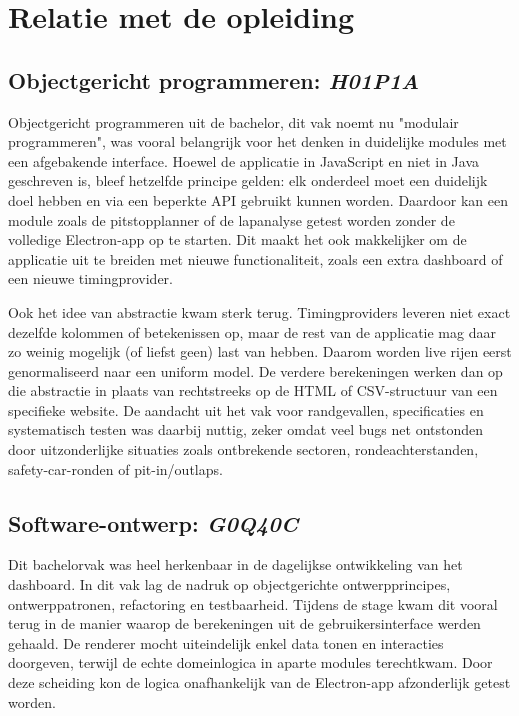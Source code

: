 
\chapter{Relatie met de opleiding}
\label{chap:opleiding}

\section{Objectgericht programmeren: \emph{H01P1A}}
Objectgericht programmeren uit de bachelor, dit vak noemt nu "modulair programmeren",
was vooral belangrijk voor het denken in duidelijke modules met een afgebakende interface. Hoewel de
applicatie in JavaScript en niet in Java geschreven is, bleef hetzelfde principe gelden: elk onderdeel
moet een duidelijk doel hebben en via een beperkte API gebruikt kunnen worden. Daardoor kan een module
zoals de pitstopplanner of de lapanalyse getest worden zonder de volledige Electron-app op te starten. Dit maakt het ook makkelijker om de applicatie uit te breiden met nieuwe functionaliteit, zoals een extra dashboard of een nieuwe timingprovider.

Ook het idee van abstractie kwam sterk terug. Timingproviders leveren niet exact dezelfde kolommen of
betekenissen op, maar de rest van de applicatie mag daar zo weinig mogelijk (of liefst geen) last van hebben. Daarom
worden live rijen eerst genormaliseerd naar een uniform model. De verdere berekeningen werken dan op
die abstractie in plaats van rechtstreeks op de HTML of CSV-structuur van een specifieke website. De
aandacht uit het vak voor randgevallen, specificaties en systematisch testen was daarbij nuttig,
zeker omdat veel bugs net ontstonden door uitzonderlijke situaties zoals ontbrekende sectoren,
rondeachterstanden, safety-car-ronden of pit-in/outlaps.

\section{Software-ontwerp: \emph{G0Q40C}}
Dit bachelorvak was heel herkenbaar in de dagelijkse ontwikkeling van het dashboard. In dit vak lag
de nadruk op objectgerichte ontwerpprincipes, ontwerppatronen, refactoring en testbaarheid. Tijdens de stage kwam dit vooral terug in de manier waarop de berekeningen uit de
gebruikersinterface werden gehaald. De renderer mocht uiteindelijk enkel data tonen en interacties
doorgeven, terwijl de echte domeinlogica in aparte modules terechtkwam. Door deze scheiding kon de logica onafhankelijk van de Electron-app afzonderlijk getest worden.

